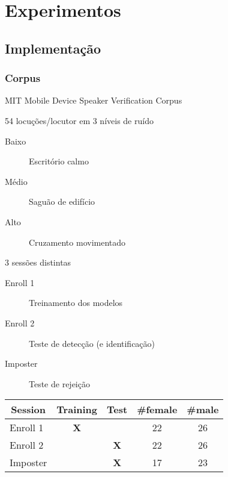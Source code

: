 \section{Experimentos}
\label{sec:experiments}

\contentscurrent

\subsection{Implementação}

\begin{frame}
\frametitle{Corpus}
\begin{description}
    \item[Base] MIT Mobile Device Speaker Verification Corpus
    \pause
    \item 54 locuções/locutor em 3 níveis de ruído
    \pause
    \begin{description}
        \item[Baixo] Escritório calmo
        \item[Médio] Saguão de edifício
        \item[Alto] Cruzamento movimentado
        \pause
    \end{description}
    \item 3 sessões distintas
    \begin{description}
        \item[Enroll 1] Treinamento dos modelos
        \item[Enroll 2] Teste de detecção (e identificação)
        \item[Imposter] Teste de rejeição
        \pause
    \end{description}
\end{description}

\begin{table}[h]
    \centering
    \begin{tabular}{|l|c|c|c|c|}
    \hline
    \multicolumn{1}{|c|}{{\bf Session}} & {\bf Training} & {\bf Test} & {\bf \#female} & {\bf \#male} \\ \hline
    Enroll 1 & {\bf X} & {\bf } & 22 & 26 \\ \hline
    Enroll 2 & {\bf } & {\bf X} & 22 & 26 \\ \hline
    Imposter & {\bf } & {\bf X} & 17 & 23 \\ \hline
    \end{tabular}
\end{table}
\end{frame}

